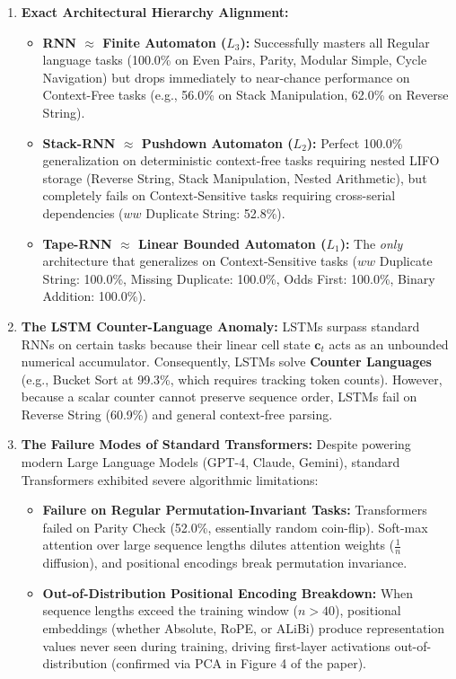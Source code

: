 \documentclass[11pt,a4paper]{article}
\begin{document}
\begin{enumerate}[leftmargin=1.5em, itemsep=4pt]
    \item \textbf{Exact Architectural Hierarchy Alignment:}
    \begin{itemize}
        \item \textbf{RNN $\approx$ Finite Automaton ($L_3$):} Successfully masters all Regular language tasks (100.0\% on Even Pairs, Parity, Modular Simple, Cycle Navigation) but drops immediately to near-chance performance on Context-Free tasks (e.g., 56.0\% on Stack Manipulation, 62.0\% on Reverse String).
        \item \textbf{Stack-RNN $\approx$ Pushdown Automaton ($L_2$):} Perfect 100.0\% generalization on deterministic context-free tasks requiring nested LIFO storage (Reverse String, Stack Manipulation, Nested Arithmetic), but completely fails on Context-Sensitive tasks requiring cross-serial dependencies ($ww$ Duplicate String: 52.8\%).
        \item \textbf{Tape-RNN $\approx$ Linear Bounded Automaton ($L_1$):} The \textit{only} architecture that generalizes on Context-Sensitive tasks ($ww$ Duplicate String: 100.0\%, Missing Duplicate: 100.0\%, Odds First: 100.0\%, Binary Addition: 100.0\%).
    \end{itemize}

    \item \textbf{The LSTM Counter-Language Anomaly:}
    LSTMs surpass standard RNNs on certain tasks because their linear cell state $\mathbf{c}_t$ acts as an unbounded numerical accumulator. Consequently, LSTMs solve \textbf{Counter Languages} (e.g., Bucket Sort at 99.3\%, which requires tracking token counts). However, because a scalar counter cannot preserve sequence order, LSTMs fail on Reverse String (60.9\%) and general context-free parsing.

    \item \textbf{The Failure Modes of Standard Transformers:}
    Despite powering modern Large Language Models (GPT-4, Claude, Gemini), standard Transformers exhibited severe algorithmic limitations:
    \begin{itemize}
        \item \textbf{Failure on Regular Permutation-Invariant Tasks:} Transformers failed on Parity Check (52.0\%, essentially random coin-flip). Soft-max attention over large sequence lengths dilutes attention weights ($\frac{1}{n}$ diffusion), and positional encodings break permutation invariance.
        \item \textbf{Out-of-Distribution Positional Encoding Breakdown:} When sequence lengths exceed the training window ($n > 40$), positional embeddings (whether Absolute, RoPE, or ALiBi) produce representation values never seen during training, driving first-layer activations out-of-distribution (confirmed via PCA in Figure 4 of the paper).
    \end{itemize}


\end{enumerate}
\end{document}
